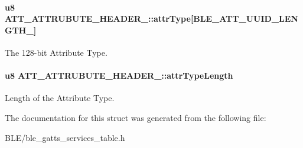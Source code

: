 \paragraph[{\texorpdfstring{attr\+Type}{attrType}}]{\setlength{\rightskip}{0pt plus 5cm}u8 A\+T\+T\+\_\+\+A\+T\+T\+R\+U\+B\+U\+T\+E\+\_\+\+H\+E\+A\+D\+E\+R\+\_\+::attr\+Type\mbox{[}{\bf B\+L\+E\+\_\+\+A\+T\+T\+\_\+\+U\+U\+I\+D\+\_\+\+L\+E\+N\+G\+T\+H\+\_}\mbox{]}}\hypertarget{struct_a_t_t___a_t_t_r_u_b_u_t_e___h_e_a_d_e_r__16_a6de7a56a87ecba5790d8591e10c989eb}{}\label{struct_a_t_t___a_t_t_r_u_b_u_t_e___h_e_a_d_e_r__16_a6de7a56a87ecba5790d8591e10c989eb}
The 128-\/bit Attribute Type. 
\paragraph[{\texorpdfstring{attr\+Type\+Length}{attrTypeLength}}]{\setlength{\rightskip}{0pt plus 5cm}u8 A\+T\+T\+\_\+\+A\+T\+T\+R\+U\+B\+U\+T\+E\+\_\+\+H\+E\+A\+D\+E\+R\+\_\+::attr\+Type\+Length}\hypertarget{struct_a_t_t___a_t_t_r_u_b_u_t_e___h_e_a_d_e_r__16_ab6e70a61429f1a5833591f83bcfee449}{}\label{struct_a_t_t___a_t_t_r_u_b_u_t_e___h_e_a_d_e_r__16_ab6e70a61429f1a5833591f83bcfee449}
Length of the Attribute Type. 

The documentation for this struct was generated from the following file\+:\begin{DoxyCompactItemize}
\item 
B\+L\+E/ble\+\_\+gatts\+\_\+services\+\_\+table.\+h\end{DoxyCompactItemize}
